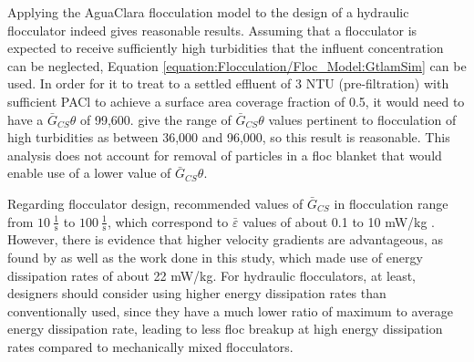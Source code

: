 \documentclass[letterpaper,10pt,english]{sphinxmanual}
\begin{document}
Applying the AguaClara flocculation model to the design of a hydraulic flocculator indeed gives reasonable results. Assuming that a flocculator is expected to receive sufficiently high turbidities that the influent concentration can be neglected, Equation \eqref{equation:Flocculation/Floc_Model:GtlamSim} can be used. In order for it to treat to a settled effluent of 3 NTU (pre-filtration) with sufficient PACl to achieve a surface area coverage fraction of 0.5, it would need to have a \(\bar G_{CS}\theta\) of 99,600. \label{\detokenize{Flocculation/Floc_Model:id25}}{\hyperref[\detokenize{Flocculation/Floc_Model:floc-model-davis-introduction-2008}]{\sphinxcrossref{{[}DC08{]}}}} give the range of  \(\bar G_{CS}\theta\) values pertinent to flocculation of high turbidities as between 36,000 and 96,000, so this result is reasonable. This analysis does not account for removal of particles in a floc blanket that would enable use of a lower value of \(\bar G_{CS}\theta\).

Regarding flocculator design, recommended values of \(\bar G_{CS}\) in flocculation range from \(10\:\mathrm{\frac{1}{s}}\) to \(100\:\mathrm{\frac{1}{s}}\), which correspond to \(\bar{\varepsilon}\) values of about 0.1 to 10 mW/kg \label{\detokenize{Flocculation/Floc_Model:id26}}{\hyperref[\detokenize{Flocculation/Floc_Model:floc-model-mcconnachie-design-2000}]{\sphinxcrossref{{[}ML00{]}}}}. However, there is evidence that higher velocity gradients are advantageous, as found by \label{\detokenize{Flocculation/Floc_Model:id27}}{\hyperref[\detokenize{Flocculation/Floc_Model:floc-model-garland-revisiting-2016}]{\sphinxcrossref{{[}GWSL16{]}}}} as well as the work done in this study, which made use of energy dissipation rates of about 22 mW/kg. For hydraulic flocculators, at least, designers should consider using higher energy dissipation rates than conventionally used, since they have a much lower ratio of maximum to average energy dissipation rate, leading to less floc breakup at high energy dissipation rates compared to mechanically mixed flocculators.
\end{document}
